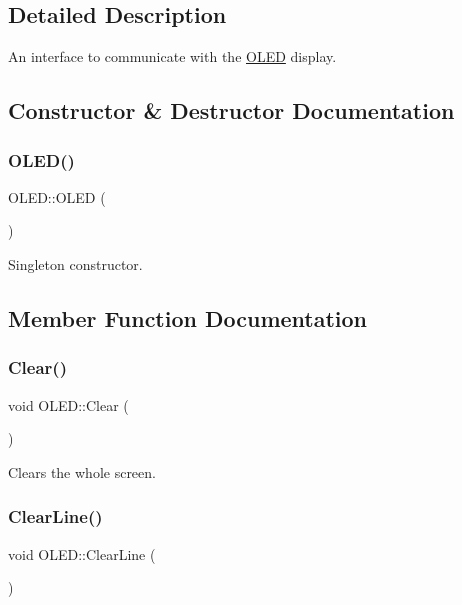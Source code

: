 \subsection{Detailed Description}
An interface to communicate with the \hyperlink{class_o_l_e_d}{O\+L\+ED} display. 

\subsection{Constructor \& Destructor Documentation}
\hypertarget{class_o_l_e_d_a8eabf371b5642d99800adb759dab27fd}{}\label{class_o_l_e_d_a8eabf371b5642d99800adb759dab27fd} 
\subsubsection{\texorpdfstring{O\+L\+E\+D()}{OLED()}}
{\footnotesize\ttfamily O\+L\+E\+D\+::\+O\+L\+ED (\begin{DoxyParamCaption}{ }\end{DoxyParamCaption})\hspace{0.3cm}{\ttfamily [protected]}}

Singleton constructor. 

\subsection{Member Function Documentation}
\hypertarget{class_o_l_e_d_a6c7bb1fc91b3e574a275f90643da140a}{}\label{class_o_l_e_d_a6c7bb1fc91b3e574a275f90643da140a} 
\subsubsection{\texorpdfstring{Clear()}{Clear()}}
{\footnotesize\ttfamily void O\+L\+E\+D\+::\+Clear (\begin{DoxyParamCaption}{ }\end{DoxyParamCaption})}

Clears the whole screen. \hypertarget{class_o_l_e_d_a3a571f5ea7a183fa14932cd5b2c423eb}{}\label{class_o_l_e_d_a3a571f5ea7a183fa14932cd5b2c423eb} 
\subsubsection{\texorpdfstring{Clear\+Line()}{ClearLine()}}
{\footnotesize\ttfamily void O\+L\+E\+D\+::\+Clear\+Line (\begin{DoxyParamCaption}{ }\end{DoxyParamCaption})}

